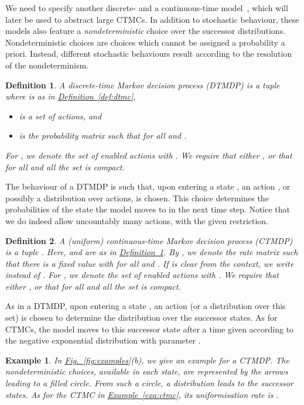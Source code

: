 \documentclass[10pt,twocolumn]{article}
\newtheorem{definition}{Definition}
\newtheorem{example}{Example}
\newcommand{\refdef}[1]{\texorpdfstring{\hyperref[def:#1]{Definition~\ref*{def:#1}}}{Definition \ref*{def:#1}}}
\newcommand{\reffig}[1]{\texorpdfstring{\hyperref[fig:#1]{Fig.~\ref*{fig:#1}}}{Fig.~\ref*{fig:#1}}}
\newcommand{\refexa}[1]{\texorpdfstring{\hyperref[exa:#1]{Example~\ref*{exa:#1}}}{Example~\ref*{exa:#1}}}
\begin{document}
We need to specify another discrete- and a continuous-time model~\cite{Howard60,Bert05}, which will later be used to abstract large CTMCs.
In addition to stochastic behaviour, these models also feature a \emph{nondeterministic} choice over the successor distributions.
Nondeterministic choices are choices which cannot be assigned a probability a priori.
Instead, different stochastic behaviours result according to the resolution of the nondeterminism.
\begin{definition}
  \label{def:dtmdp}
A \emph{discrete-time Markov decision process (DTMDP)} is a tuple  where  is as in \refdef{dtmc},
\begin{itemize}
  \item  is a set of \emph{actions}, and
  \item  is the \emph{probability matrix} such that  for all  and . 
  \end{itemize}
For , we denote the set of \emph{enabled} actions with .
  We require that either , or that for all  and all  the set  is compact.
\end{definition}
The behaviour of a DTMDP is such that, upon entering a state , an action , or possibly a distribution over actions, is chosen.
This choice determines the probabilities of the state the model moves to in the next time step.
Notice that we do indeed allow uncountably many actions, with the given restriction.

\begin{definition}
  \label{def:ctmdp}
A \emph{(uniform) continuous-time Markov decision process (CTMDP)} is a tuple .
  Here,  and  are as in \refdef{dtmdp}.
  By , we denote
  the \emph{rate matrix} such that there is a fixed value  with
   for all  and .
  If  is clear from the context, we write  instead of .
  For , we denote the set of \emph{enabled} actions with .
  We require that either , or that for all  and all  the set  is compact.
\end{definition}
As in a DTMDP, upon entering a state , an action  (or a distribution over this set) is chosen to determine the distribution over the successor states.
As for CTMCs, the model moves to this successor state after a time given according to the negative exponential distribution with parameter .

\begin{example}
  \label{exa:ctmdp}
In \reffig{examples}(b), we give an example for a CTMDP.
  The nondeterministic choices, available in each state, are represented 
  by the arrows leading to a filled circle. From such a circle, a 
  distribution leads to the successor states. As for the CTMC in \refexa{ctmc}, 
  its uniformisation rate is .
\end{example}
\end{document}
